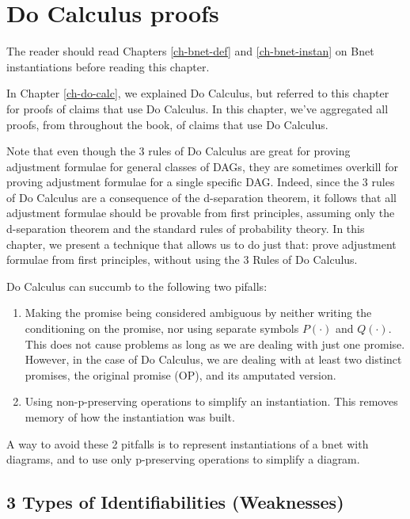 \chapter{Do Calculus proofs}
\label{ch-do-calc-proofs}

The reader should read Chapters \ref{ch-bnet-def}
and \ref{ch-bnet-instan} on Bnet instantiations before reading this
chapter.

In Chapter \ref{ch-do-calc},
we explained Do Calculus,
but referred to this
chapter for proofs
of claims that
use Do Calculus.
In this chapter, we've
aggregated
 all proofs, from
throughout the book,
of claims that use Do Calculus.

Note that even though the 3
rules of Do Calculus
are great for proving
adjustment formulae
for general classes of DAGs,
they are sometimes overkill
for proving
 adjustment formulae
for a single specific DAG.
Indeed, since the
 3 rules of Do Calculus
are a consequence
of the d-separation theorem, it follows that
all adjustment
formulae should be
provable from first principles,
assuming only
the d-separation theorem
and the standard rules of
probability theory.
In this chapter, we present
a technique that allows us to do just that: prove 
adjustment formulae from first principles,
without using the 
3 Rules of Do Calculus.



Do Calculus can succumb to the
following two pifalls:

\begin{enumerate}
\item Making the
promise being considered  ambiguous 
 by neither writing
the conditioning on the promise,
nor using separate symbols $P(\cdot)$ and $Q(\cdot)$.
This does not cause problems
as long as we are dealing
with just one promise.
However, in the case
of Do Calculus,
we are dealing with
at least two
distinct promises,
the original promise (OP),
and its amputated version.
\item Using non-p-preserving operations
to simplify an instantiation.
This removes memory of
how the instantiation was built. 
\end{enumerate}
A way to 
avoid these 2 pitfalls is to 
represent instantiations of
a bnet with diagrams, and
to use only 
 p-preserving operations
to simplify a diagram.



\section{3  Types of Identifiabilities (Weaknesses)}

